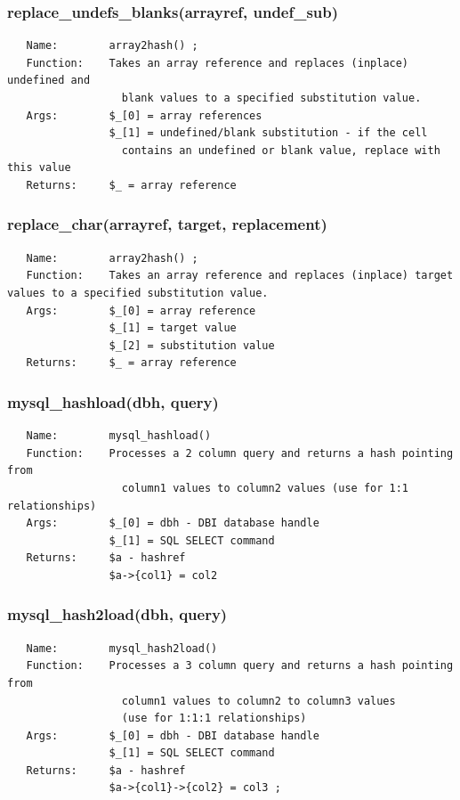 \documentclass{article}
\begin{document}
\subsubsection*{replace\_undefs\_blanks(arrayref, undef\_sub)\label{pibase_pm_replace_undefs_blanks_arrayref_undef_sub_}}
\begin{verbatim}
   Name:        array2hash() ;
   Function:    Takes an array reference and replaces (inplace) undefined and
                  blank values to a specified substitution value.
   Args:        $_[0] = array references
                $_[1] = undefined/blank substitution - if the cell
                  contains an undefined or blank value, replace with this value
   Returns:     $_ = array reference
\end{verbatim}
\subsubsection*{replace\_char(arrayref, target, replacement)\label{pibase_pm_replace_char_arrayref_target_replacement_}}
\begin{verbatim}
   Name:        array2hash() ;
   Function:    Takes an array reference and replaces (inplace) target values to a specified substitution value.
   Args:        $_[0] = array reference
                $_[1] = target value
                $_[2] = substitution value
   Returns:     $_ = array reference
\end{verbatim}
\subsubsection*{mysql\_hashload(dbh, query)\label{pibase_pm_mysql_hashload_dbh_query_}}
\begin{verbatim}
   Name:        mysql_hashload()
   Function:    Processes a 2 column query and returns a hash pointing from
                  column1 values to column2 values (use for 1:1 relationships)
   Args:        $_[0] = dbh - DBI database handle
                $_[1] = SQL SELECT command
   Returns:     $a - hashref
                $a->{col1} = col2
\end{verbatim}
\subsubsection*{mysql\_hash2load(dbh, query)\label{pibase_pm_mysql_hash2load_dbh_query_}}
\begin{verbatim}
   Name:        mysql_hash2load()
   Function:    Processes a 3 column query and returns a hash pointing from
                  column1 values to column2 to column3 values
                  (use for 1:1:1 relationships)
   Args:        $_[0] = dbh - DBI database handle
                $_[1] = SQL SELECT command
   Returns:     $a - hashref
                $a->{col1}->{col2} = col3 ;
\end{verbatim}
\end{document}
